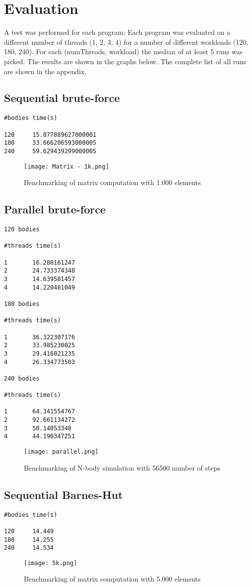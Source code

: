 \documentclass{article}
\begin{document}
\section{Evaluation}
A test was performed for each program: Each program was evaluated on a different number of threads (1, 2, 3, 4) for a number of different workloads (120, 180, 240). For each (numThreads, workload) the median of at least 5 runs was picked. The results are shown in the graphs below. The complete list of all runs are shown in the appendix.


\subsection{Sequential brute-force}
\begin{verbatim}
#bodies time(s)

120     15.077889627000001
180     33.666206593000005
240     59.629439299000005
\end{verbatim}
\begin{figure}[h]
\centering
\texttt{[image: Matrix - 1k.png]}
\caption{Benchmarking of matrix computation with 1.000 elements}
\end{figure}      

\subsection{Parallel brute-force}
\begin{verbatim}
120 bodies

#threads time(s)

1       16.280161247
2       24.733374348
3       14.639581457
4       14.220481049

180 bodies 

#threads time(s)

1       36.322307176  
2       33.985230025  
3       29.416021235
4       26.334773503

240 bodies

#threads time(s)

1       64.341554767 
2       92.661134272 
3       50.14053348 
4       44.190347251
\end{verbatim}
\begin{figure}[h]
\centering
\texttt{[image: parallel.png]}
\caption{Benchmarking of N-body simulation with 56500 number of steps}
\end{figure}      

\clearpage
\subsection{Sequential Barnes-Hut}
\begin{verbatim}
#bodies time(s)

120     14.449
180     14.255
240     14.534
\end{verbatim}
\begin{figure}[h]
\centering
\texttt{[image: 5k.png]}
\caption{Benchmarking of matrix computation with 5.000 elements}
\end{figure}      
\clearpage
\end{document}
